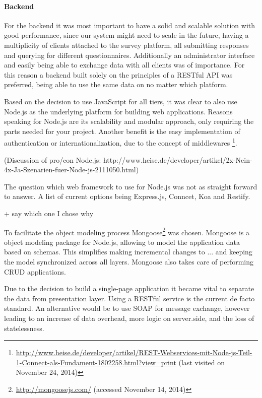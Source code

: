 	\paragraph{Backend}

		For the backend it was most important to have a solid and scalable solution with good performance, since our system might need to scale in the future, having a multiplicity of clients attached to the survey platform, all submitting responses and querying for different questionnaires. Additionally an administrator interface and easily being able to exchange data with all clients was of importance. For this reason a backend built solely on the principles of a RESTful API was preferred, being able to use the same data on no matter which platform.

		Based on the decision to use JavaScript for all tiers, it was clear to also use Node.js as the underlying platform for building web applications. Reasons speaking for Node.js are its scalability and modular approach, only requiring the parts needed for your project. Another benefit is the easy implementation of authentication or internationalization, due to the concept of middlewares \footnote{\url{http://www.heise.de/developer/artikel/REST-Webservices-mit-Node-js-Teil-1-Connect-als-Fundament-1802258.html?view=print} (last visited on November 24, 2014)}. 

				(Discussion of pro/con Node.js: http://www.heise.de/developer/artikel/2x-Nein-4x-Ja-Szenarien-fuer-Node-js-2111050.html)

		The question which web framework to use for Node.js was not as straight forward to answer. A list of current options being Express.js, Conncet, Koa and Restify. 

				+ say which one I chose why


		To facilitate the object modeling process Mongoose\footnote{\url{http://mongoosejs.com/} (accessed November 14, 2014)} was chosen. Mongoose is a object modeling package for Node.js, allowing to model the application data based on schemas. This simplifies making incremental changes to ... and keeping the model synchronized across all layers. 	Mongoose also takes care of performing CRUD applications.


		Due to the decision to build a single-page application it became vital to separate the data from presentation layer. Using a RESTful service is the current de facto standard. An alternative would be to use SOAP for message exchange, however leading to an increase of data overhead, more logic on server.side, and the loss of statelessness.


